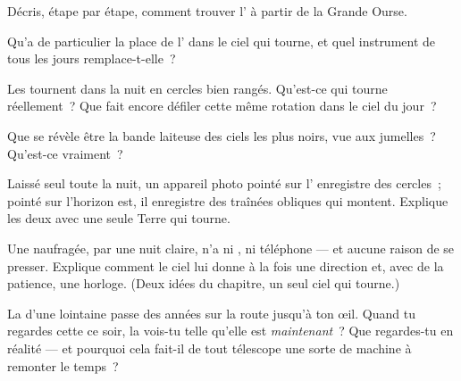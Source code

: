 \begin{exercise}[$\star$]\label{exo:g5:stars-night-sky:5}
Décris, étape par étape, comment trouver l' à partir de
la Grande Ourse.
\end{exercise}

\begin{exercise}[$\star$]\label{exo:g5:stars-night-sky:6}
Qu'a de particulier la place de l' dans le ciel qui
tourne, et quel instrument de tous les jours remplace-t-elle~?
\end{exercise}

\begin{exercise}[$\star$]\label{exo:g5:stars-night-sky:7}
Les  tournent dans la nuit en cercles bien rangés. Qu'est-ce
qui tourne réellement~? Que fait encore défiler cette même rotation
dans le ciel du jour~?
\end{exercise}

\begin{exercise}[$\star$]\label{exo:g5:stars-night-sky:8}
Que se révèle être la bande laiteuse des ciels les plus noirs, vue
aux jumelles~? Qu'est-ce vraiment~?
\end{exercise}

\begin{exercise}[$\star\star$]\label{exo:g5:stars-night-sky:9}
Laissé seul toute la nuit, un appareil photo pointé sur l' enregistre des cercles~; pointé sur l'horizon est, il
enregistre des traînées obliques qui montent. Explique les deux
 avec une seule Terre qui tourne.
\end{exercise}

\begin{exercise}[$\star\star$]\label{exo:g5:stars-night-sky:10}
Une naufragée, par une nuit claire, n'a ni , ni téléphone ---
et aucune raison de se presser. Explique comment le ciel lui donne à
la fois une direction et, avec de la patience, une horloge. (Deux
idées du chapitre, un seul ciel qui tourne.)
\end{exercise}

\begin{exercise}[$\star\star$]\label{exo:g5:stars-night-sky:11}
La  d'une  lointaine passe des années sur la route
jusqu'à ton œil. Quand tu regardes cette  ce soir, la vois-tu
telle qu'elle est \emph{maintenant}~? Que regardes-tu en réalité ---
et pourquoi cela fait-il de tout télescope une sorte de machine à
remonter le temps~?
\end{exercise}
